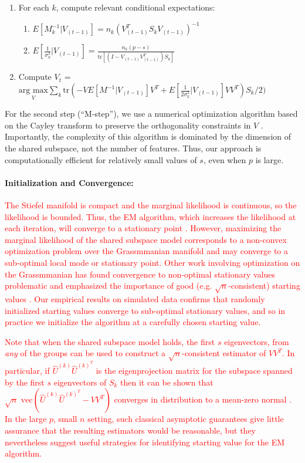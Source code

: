 \documentclass{statsoc}
\newcommand{\edits}[1]{{\textsf{\textcolor{red}{#1}}}}
\newcommand{\edits}[1]{#1}
\begin{document}
\begin{enumerate}
\item For each $k$, compute relevant conditional expectations:
\begin{enumerate}
\item $E[M_k^{-1} | V_{(t-1)}] = n_k(V_{(t-1)}^T S_kV_{(t-1)})^{-1}$
\item $E[\frac{1}{\sigma_k^2}|V_{(t-1)}] = \frac{n_k(p-s)}{\text{tr}[(I-V_{(t-1)}V_{(t-1)}^T)S_k]}$
\end{enumerate}
\item Compute $V_{t}$ = $\underset{V}{\text{arg } \text{max}}  \sum_k \text{tr}\left(-VE[M^{-1}|V_{(t-1)}]V^T +
       E[\frac{1}{2\sigma_k^2}|V_{(t-1)}]VV^T\right)S_k/2)$ 
\end{enumerate}

For the second step (``M-step''), we use a numerical optimization algorithm based on
the Cayley transform to preserve the orthogonality constraints in $V$
\citep{Wen2013}.  Importantly, the complexity of this algorithm is
dominated by the dimension of the shared subspace, not the number of
features.  Thus, our approach is computationally efficient for
relatively small values of $s$, even when $p$ is large.

\paragraph{Initialization and Convergence:}
\edits{The Stiefel manifold is compact and the marginal
  likelihood is continuous, so the likelihood is bounded.  Thus, the EM
  algorithm, which increases the likelihood at each iteration, will
  converge to a stationary point \citep{WuEM}. However, maximizing the
  marginal likelihood of the shared subspace model corresponds to a
  non-convex optimization problem over the Grassmmanian manifold and
  may converge to a sub-optimal local mode or stationary
  point. Other work involving optimization on the Grassmmanian has
  found convergence to non-optimal stationary values problematic and emphasized
  the importance of good (e.g. $\sqrt{n}$-consistent) starting values
  \citep{Cook2016}. Our empirical results on simulated data confirms
  that randomly initialized starting values converge to sub-optimal
  stationary values, and so in practice we initialize the algorithm at
  a carefully chosen starting value.}

\edits{Note that when the shared subspace model holds, the first $s$
  eigenvectors, from \emph{any} of the groups can be used to construct a
  $\sqrt{n}$-consistent estimator of $VV^T$.  In particular, if
  $\hat{U}^{(k)}\hat{U}^{(k)^T}$ is the eigenprojection matrix for the
  subspace spanned by the first $s$ eigenvectors of $S_k$ then it can
  be shown that
  $\sqrt{n} \text{ vec}(\hat{U}^{(k)}\hat{U}^{(k)^T} - VV^T)$
  converges in distribution to a mean-zero normal
  \citep{kollo2000}.  In the large $p$, small $n$ setting, such
  classical asymptotic guarantees give little assurance that the
  resulting estimators would be reasonable, but they nevertheless
  suggest useful strategies for identifying starting value for the EM
  algorithm.}  
\end{document}
